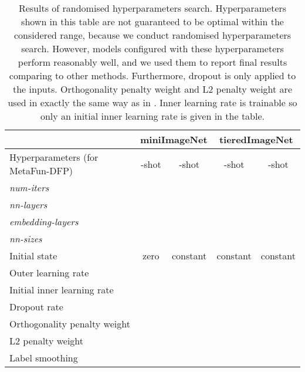\documentclass{article}
\theoremstyle{definition}
\begin{document}
\begin{table*}[!htb] 
  \centering
  \footnotesize
  \begin{threeparttable}[]
  \caption{Results of randomised hyperparameters search. Hyperparameters shown in this table are not guaranteed to be optimal within the considered range, because we conduct randomised hyperparameters search. However, models configured with these hyperparameters perform reasonably well, and we used them to report final results comparing to other methods. Furthermore, dropout is only applied to the inputs. Orthogonality penalty weight and L2 penalty weight are used in exactly the same way as in \citet{rusu2018meta}. Inner learning rate  is trainable so only an initial inner learning rate is given in the table.}
  \begin{tabular}{l|cc|cc}
  \toprule
     & \multicolumn{2}{c|}{\textbf{miniImageNet}} &  \multicolumn{2}{c}{\textbf{tieredImageNet}}\\ 
    \toprule
    Hyperparameters (for MetaFun-DFP)  &    -shot & -shot & -shot & -shot \\ 
    \midrule
    \emph{num-iters} &  &  &  &  \\
    \emph{nn-layers}  &  &  &  &  \\
    \emph{embedding-layers} &  &  &  &  \\
    \emph{nn-sizes} &  &  &  &  \\
    Initial state & zero & constant & constant & constant \\ 
    \midrule 
    Outer learning rate &  &  &  &  \\ 
    Initial inner learning rate &  &  &  &  \\ 
    Dropout rate &  &  &  &  \\ 
    Orthogonality penalty weight &  &  &   &  \\ 
    L2 penalty weight &  &  &  &  \\ 
    Label smoothing &  &  &  &  \\ 
    \bottomrule
  \end{tabular}
  

\end{threeparttable}
\end{table*}
\end{document}
